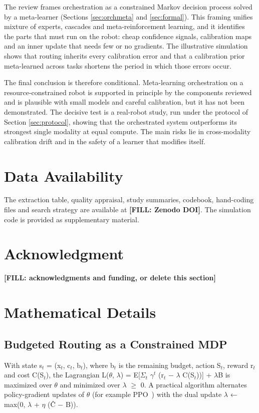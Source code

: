 \documentclass[journal]{IEEEtran}
\newcommand{\fillin}[1]{{\color{red}\bfseries [FILL: #1]}}
\begin{document}
The review frames orchestration as a constrained Markov decision process solved by a meta-learner (Sections \ref{sec:orchmeta} and \ref{sec:formal}). This framing unifies mixture of experts, cascades and meta-reinforcement learning, and it identifies the parts that must run on the robot: cheap confidence signals, calibration maps and an inner update that needs few or no gradients. The illustrative simulation shows that routing inherits every calibration error and that a calibration prior meta-learned across tasks shortens the period in which those errors occur.

The final conclusion is therefore conditional. Meta-learning orchestration on a resource-constrained robot is supported in principle by the components reviewed and is plausible with small models and careful calibration, but it has not been demonstrated. The decisive test is a real-robot study, run under the protocol of Section \ref{sec:protocol}, showing that the orchestrated system outperforms its strongest single modality at equal compute. The main risks lie in cross-modality calibration drift and in the safety of a learner that modifies itself.


\section*{Data Availability}
The extraction table, quality appraisal, study summaries, codebook, hand-coding files and search strategy are available at \fillin{Zenodo DOI}. The simulation code is provided as supplementary material.

\section*{Acknowledgment}
\fillin{acknowledgments and funding, or delete this section}


\appendices

\section{Mathematical Details}\label{app:math}

\subsection{Budgeted Routing as a Constrained MDP}\label{app:cmdp}
With state s\ensuremath{_t} = (x\ensuremath{_t}, c\ensuremath{_t}, b\ensuremath{_t}), where b\ensuremath{_t} is the remaining budget, action S\ensuremath{_t}, reward r\ensuremath{_t} and cost C(S\ensuremath{_t}), the Lagrangian L(\ensuremath{\theta}, \ensuremath{\lambda}) = E[\ensuremath{\Sigma}\ensuremath{_t} \ensuremath{\gamma}\ensuremath{^t} (r\ensuremath{_t} \ensuremath{-} \ensuremath{\lambda} C(S\ensuremath{_t}))] + \ensuremath{\lambda}B is maximized over \ensuremath{\theta} and minimized over \ensuremath{\lambda} \ensuremath{\geq } 0. A practical algorithm alternates policy-gradient updates of \ensuremath{\theta} (for example PPO~\cite{Schulman2017}) with the dual update \ensuremath{\lambda} ← max(0, \ensuremath{\lambda} + \ensuremath{\eta } (Ĉ \ensuremath{-} B)).
\end{document}
